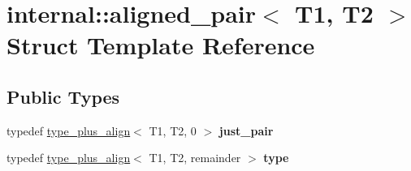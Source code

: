 \hypertarget{structinternal_1_1aligned__pair}{}\section{internal\+:\+:aligned\+\_\+pair$<$ T1, T2 $>$ Struct Template Reference}
\label{structinternal_1_1aligned__pair}
\subsection*{Public Types}
\begin{DoxyCompactItemize}
\item 
\hypertarget{structinternal_1_1aligned__pair_aeb7c5e7e13ddf240af1d5a37faa25d03}{}typedef \hyperlink{structinternal_1_1type__plus__align}{type\+\_\+plus\+\_\+align}$<$ T1, T2, 0 $>$ {\bfseries just\+\_\+pair}\label{structinternal_1_1aligned__pair_aeb7c5e7e13ddf240af1d5a37faa25d03}

\item 
\hypertarget{structinternal_1_1aligned__pair_acb5b24aa15e73098c05fdccfa57a5de2}{}typedef \hyperlink{structinternal_1_1type__plus__align}{type\+\_\+plus\+\_\+align}$<$ T1, T2, remainder $>$ {\bfseries type}\label{structinternal_1_1aligned__pair_acb5b24aa15e73098c05fdccfa57a5de2}

\end{DoxyCompactItemize}
